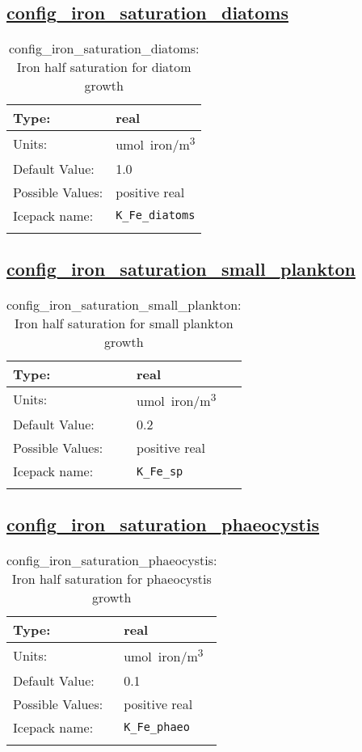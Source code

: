 \subsection[config\_iron\_saturation\_diatoms]{\hyperref[sec:nm_tab_biogeochemistry]{config\_iron\_saturation\_diatoms}}
\label{subsec:nm_sec_config_iron_saturation_diatoms}
\begin{center}
\begin{longtable}{| p{2.0in} || p{4.0in} |}
    \hline
    Type: & real \\
    \hline
    Units: & \si{umol.iron/m^3} \\
    \hline
    Default Value: & 1.0 \\
    \hline
    Possible Values: & positive real \\
    \hline
    \hline
    Icepack name: & \verb+K_Fe_diatoms+ \\
    \caption{config\_iron\_saturation\_diatoms: Iron half saturation for diatom growth}
\end{longtable}
\end{center}
\subsection[config\_iron\_saturation\_small\_plankton]{\hyperref[sec:nm_tab_biogeochemistry]{config\_iron\_saturation\_small\_plankton}}
\label{subsec:nm_sec_config_iron_saturation_small_plankton}
\begin{center}
\begin{longtable}{| p{2.0in} || p{4.0in} |}
    \hline
    Type: & real \\
    \hline
    Units: & \si{umol.iron/m^3} \\
    \hline
    Default Value: & 0.2 \\
    \hline
    Possible Values: & positive real \\
    \hline
    \hline
    Icepack name: & \verb+K_Fe_sp+ \\
    \caption{config\_iron\_saturation\_small\_plankton: Iron half saturation for small plankton growth}
\end{longtable}
\end{center}
\subsection[config\_iron\_saturation\_phaeocystis]{\hyperref[sec:nm_tab_biogeochemistry]{config\_iron\_saturation\_phaeocystis}}
\label{subsec:nm_sec_config_iron_saturation_phaeocystis}
\begin{center}
\begin{longtable}{| p{2.0in} || p{4.0in} |}
    \hline
    Type: & real \\
    \hline
    Units: & \si{umol.iron/m^3} \\
    \hline
    Default Value: & 0.1 \\
    \hline
    Possible Values: & positive real \\
    \hline
    \hline
    Icepack name: & \verb+K_Fe_phaeo+ \\
    \caption{config\_iron\_saturation\_phaeocystis: Iron half saturation for phaeocystis growth}
\end{longtable}
\end{center}
